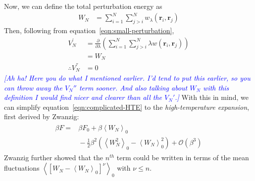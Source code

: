 \documentclass[letterpaper,twocolumn,amsmath,amssymb,prb]{revtex4-1}
\newcommand{\1}{\ensuremath{\textbf{r}_1}}
\newcommand{\2}{\ensuremath{\textbf{r}_2}}
\newcommand{\3}{\ensuremath{\textbf{r}_3}}
\newcommand{\4}{\ensuremath{\textbf{r}_4}}
\newcommand{\davidsays}[1]{\textcolor{blue}{\textit{[#1]}}}
\begin{document}
Now, we can define the total perturbation energy as
\begin{align}
  W_N &= \sum_{i=1}^N\sum_{j>i}^N w_\lambda(\mathbf{r}_i,\mathbf{r}_j)
\end{align}
Then, following from equation~\ref{eqn:small-perturbation},
\begin{align}
  V_N^{'} &= \frac{\partial}{\partial\lambda}\left(\sum_{i=1}^N\sum_{j>i}^N \lambda w(\mathbf{r}_i,\mathbf{r}_j)\right) \nonumber \\
  &= W_N \\
  \therefore V_N^{''} &= 0
\end{align}
\davidsays{Ah ha! Here you do what I mentioned earlier.  I'd tend to
  put this earlier, so you can throw away the $V_N''$ term sooner.
  And also talking about $W_N$ with this definition I would find nicer
  and clearer than all the $V_N'$.}  With this in mind, we can
simplify equation~\ref{eqn:complicated-HTE} to the
\emph{high-temperature expansion}, first derived by
Zwanzig:\cite{Zwanzig54}
\begin{align}
  \begin{split}
    \beta F = &{} \beta F_0 + \beta\left\langle W_N \right\rangle_0  \\ &{} - \frac{1}{2}\beta^2\left( \left\langle W_N^2 \right\rangle_0 - \left\langle W_N \right\rangle_0^2 \right) + \mathcal{O}(\beta^3)
  \end{split}
\end{align}
Zwanzig further showed that the $n^{th}$ term could be written in terms of the mean fluctuations $\left\langle \left[ W_N - \left\langle W_N\right\rangle_0 \right]^\nu \right\rangle_0$ with $\nu \leq n$.
\end{document}
